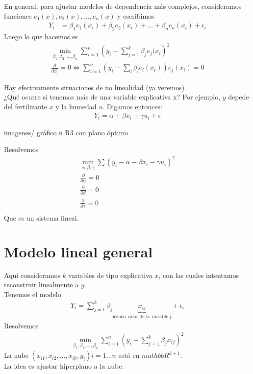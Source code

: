\documentclass[10pt]{article}
\theoremstyle{plain}
\theoremstyle{definition}
\begin{document}
 En general, para ajustar modelos de dependencia más complejos, consideramos funciones $e_{1}(x), e_{2}(x),\ldots, e_{n}(x)$ y  escribimos
 \begin{align*}
 Y_{i} &= \beta_{1}e_{1}(x_{i}) + \beta_{2}e_{2}(x_{i}) + \ldots + \beta_{n} e_{n}(x_{i}) + \epsilon_{i}
 \end{align*}
 Luego lo que hacemos es
 \begin{align*}
 \min_{\beta_{1},\beta_{2},\ldots, \beta_{n}} \sum_{i=1}^n \left(y_{i} - \sum_{j=1}^k \beta_{j} e_{j}(x_{i}\right)^2\\
\frac{\partial}{\partial \beta_{i}} = 0 \Leftrightarrow \sum_{i=1}^n \left(y_{i}- \sum_{l}\beta_{l}e_{l}(x_{i})\right)e_{j}(x_{i}) = 0
 \end{align*}
 
 Hay efectivamente situaciones de no linealidad (ya veremos)\\
 
 ¿Qué ocurre si tenemos más de una variable explicativa x? Por ejemplo, $y$ depede del fertilizante $x$  y la humedad $u$. Digamos entonces:
 \begin{align*}
 Y_{i} = \alpha + \beta x_{i} + \gamma u_{i} + \epsilon
 \end{align*}
 \begin{center}
 imagenes/ gráfico n R3 con plano óptimo
 \end{center}
 Resolvemos 
 \begin{align*}
 \min_{\alpha,\beta,\gamma} \sum (y_{i}- \alpha - \beta x_{i} - \gamma u_{i})^2\\
\frac{\partial}{\partial \alpha} = 0\\
\frac{\partial}{\partial \beta} = 0\\
\frac{\partial}{\partial \gamma} = 0\\
 \end{align*}
 Que es un sistema lineal.
 \section{Modelo lineal general}
 Aquí consideramos $k$ variables de tipo explicativa $x$, con las cuales intentamos reconstruir linealmente a $y$.\\
 
 Tenemos el modelo
 \begin{align*}
 Y_{i} = \sum_{j=1}^k \beta_{j} \underbrace{x_{ij}}_{\text{iésimo valor de la variable j}} + \epsilon_{i}
 \end{align*}
 Resolvemos
 \begin{align*}
 \min_{\beta_{1},\beta_{2},\ldots, \beta_{n}} \sum_{i=1}^n (y_{i}- \sum_{j=1}^k \beta_{j}x_{ij})^2
 \end{align*}
 La nube $(x_{i1},x_{i2},\ldots,x_{ik}, y_{i}) i=1\ldots n$ está en $mathbb{R}^{k+1}$.\\
 La idea es ajustar hiperplano a la nube.
\end{document}
